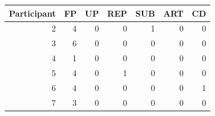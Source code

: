 \begin{tabular}{rrrrrrr}
    \toprule
    Participant & FP & UP & REP & SUB & ART & CD \\
    \midrule
    2 & 4 & 0 & 0 & 1 & 0 & 0 \\
    3 & 6 & 0 & 0 & 0 & 0 & 0 \\
    4 & 1 & 0 & 0 & 0 & 0 & 0 \\
    5 & 4 & 0 & 1 & 0 & 0 & 0 \\
    6 & 4 & 0 & 0 & 0 & 0 & 1 \\
    7 & 3 & 0 & 0 & 0 & 0 & 0 \\
    \bottomrule
    \end{tabular}
    